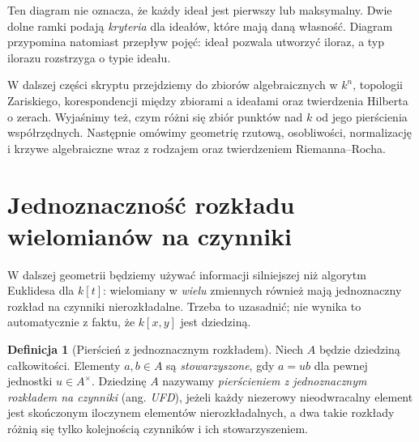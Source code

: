 \documentclass[11pt,a4paper,openany]{report}
\numberwithin{equation}{section}
\theoremstyle{plain}
\theoremstyle{definition}
\newtheorem{definicja}[twierdzenie]{Definicja}
\theoremstyle{remark}
\newcommand{\kerf}{\operatorname{ker}}
\begin{document}
\begin{center}
\end{center}

Ten diagram nie oznacza, że każdy ideał jest pierwszy lub maksymalny.
Dwie dolne ramki podają \emph{kryteria} dla ideałów, które mają
daną własność. Diagram przypomina natomiast przepływ pojęć:
ideał pozwala utworzyć iloraz, a typ ilorazu rozstrzyga o typie ideału.

W dalszej części skryptu przejdziemy do zbiorów algebraicznych
w $k^n$, topologii Zariskiego, korespondencji między zbiorami
a ideałami oraz twierdzenia Hilberta o zerach. Wyjaśnimy też,
czym różni się zbiór punktów nad $k$ od jego pierścienia współrzędnych. Następnie
omówimy geometrię rzutową, osobliwości, normalizację i krzywe
algebraiczne wraz z rodzajem oraz twierdzeniem Riemanna--Rocha.

\section{Jednoznaczność rozkładu wielomianów na czynniki}
\label{sec:ufd-preparation}

W dalszej geometrii będziemy używać informacji silniejszej niż
algorytm Euklidesa dla $k[t]$: wielomiany w \emph{wielu} zmiennych
również mają jednoznaczny rozkład na czynniki nierozkładalne.
Trzeba to uzasadnić; nie wynika to automatycznie z faktu,
że $k[x,y]$ jest dziedziną.

\begin{definicja}[Pierścień z jednoznacznym rozkładem]
Niech $A$ będzie dziedziną całkowitości. Elementy $a,b\in A$
są \emph{stowarzyszone}, gdy $a=ub$ dla pewnej jednostki
$u\in A^\times$. Dziedzinę $A$ nazywamy \emph{pierścieniem
z jednoznacznym rozkładem na czynniki} (ang. \emph{UFD}), jeżeli
każdy niezerowy nieodwracalny element jest skończonym iloczynem
elementów nierozkładalnych, a dwa takie rozkłady różnią się
tylko kolejnością czynników i ich stowarzyszeniem.
\end{definicja}
\end{document}
